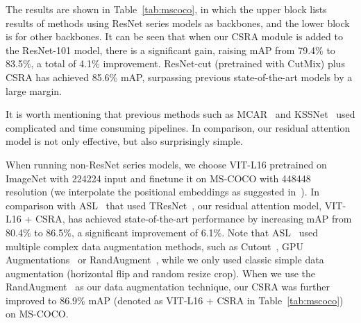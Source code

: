\documentclass[10pt,twocolumn,letterpaper]{article}
\begin{document}
The results are shown in Table~\ref{tab:mscoco}, in which the upper block lists results of methods using ResNet series models as backbones, and the lower block is for other backbones. It can be seen that when our CSRA module is added to the ResNet-101 model, there is a significant gain, raising mAP from 79.4\% to 83.5\%, a total of 4.1\% improvement. ResNet-cut (pretrained with CutMix) plus CSRA has achieved 85.6\% mAP, surpassing previous state-of-the-art models by a large margin. 

It is worth mentioning that previous methods such as MCAR~\cite{2020_arxiv_Gaobb} and KSSNet~\cite{2018_ACM_KD} used complicated and time consuming pipelines. In comparison, our residual attention model is not only effective, but also surprisingly simple.

When running non-ResNet series models, we choose VIT-L16 pretrained on ImageNet with 224224 input and finetune it on MS-COCO with 448448 resolution (we interpolate the positional embeddings as suggested in~\cite{VIT}). In comparison with ASL~\cite{ASL_2020_arxiv} that used TResNet~\cite{Tresnet}, our residual attention model, VIT-L16 + CSRA, has achieved state-of-the-art performance by increasing mAP from 80.4\% to 86.5\%, a significant improvement of 6.1\%. Note that ASL~\cite{ASL_2020_arxiv} used multiple complex data augmentation methods, such as Cutout~\cite{cutout}, GPU Augmentations~\cite{ASL_2020_arxiv} or RandAugment~\cite{randaugment}, while we only used classic simple data augmentation (horizontal flip and random resize crop). When we use the RandAugment~\cite{randaugment} as our data augmentation technique, our CSRA was further improved to 86.9\% mAP (denoted as VIT-L16 + CSRA in Table~\ref{tab:mscoco}) on MS-COCO.
\end{document}
